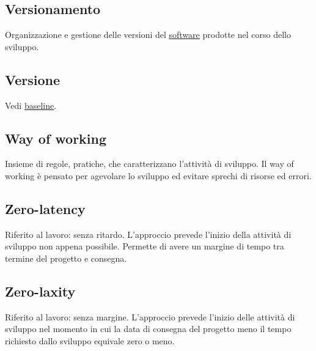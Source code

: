 	\subsection{Versionamento}
	\label{sec:versionamento}
	Organizzazione e gestione delle versioni del \underline{\hyperref[sec:prodottosoftware]{software}} prodotte nel corso dello sviluppo.

	\subsection{Versione}
	\label{sec:versione}
	Vedi \underline{\hyperref[sec:baseline]{baseline}}. \newpage

	\subsection{Way of working}
	\label{sec:wow}
	Insieme di regole, pratiche, che caratterizzano l'attività di sviluppo. Il way of working è pensato per agevolare lo sviluppo ed evitare sprechi di risorse ed errori. \newpage

	
	
	\subsection{Zero-latency}
	\label{sec:zerolatency}
	Riferito al lavoro: senza ritardo. L'approccio prevede l'inizio della attività di sviluppo non appena possibile. Permette di avere un margine di tempo tra termine del progetto e consegna.
	
	\subsection{Zero-laxity}
	\label{sec:zerolaxity}
	Riferito al lavoro: senza margine. L'approccio prevede l'inizio delle attività di sviluppo nel momento in cui la data di consegna del progetto meno il tempo richiesto dallo sviluppo equivale zero o meno. 

